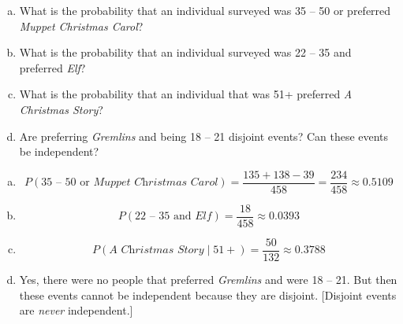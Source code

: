 \documentclass[12pt,letterpaper]{exam}
\begin{document}
\begin{questions}
\begin{enumerate}[(a)]
\item What is the probability that an individual surveyed was 35 -- 50 or preferred \textit{Muppet Christmas Carol}?
\item What is the probability that an individual surveyed was 22 -- 35 and preferred \textit{Elf}?
\item What is the probability that an individual that was 51+ preferred \textit{A Christmas Story}?
\item Are preferring \textit{Gremlins} and being 18 -- 21 disjoint events? Can these events be independent? 
\end{enumerate} \pspace

\sol 
\begin{enumerate}[(a)]
\item 
	\[
	P(\text{35 -- 50 or } \textit{Muppet Christmas Carol}) = \dfrac{135 + 138 - 39}{458} = \dfrac{234}{458} \approx 0.5109
	\] \pspace

\item 
	\[
	P(\text{22 -- 35 and } \textit{Elf}) = \dfrac{18}{458} \approx 0.0393
	\] \pspace

\item 
	\[
	P(\textit{A Christmas Story} \;|\; 51+)= \dfrac{50}{132} \approx 0.3788
	\] \pspace

\item Yes, there were no people that preferred \textit{Gremlins} and were 18 -- 21. But then these events cannot be independent because they are disjoint. [Disjoint events are \textit{never} independent.]
\end{enumerate}


\end{questions}
\end{document}
